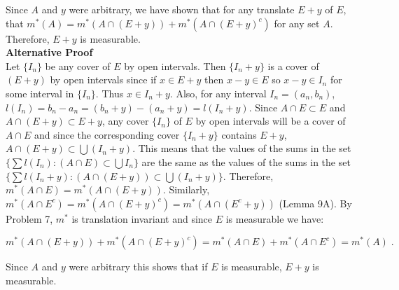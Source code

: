 \documentclass[a4paper]{article}
\begin{document}
Since $A$ and $y$ were arbitrary, we have shown that for any translate $E+y$ of $E$, that $m^*(A) = m^*(A \cap (E+y)) + m^*(A \cap (E+y)^c)$ for any set $A$. Therefore, $E+y$ is measurable.\\

{\bf Alternative Proof}\\
Let $\{I_n\}$ be any cover of $E$ by open intervals. Then $\{I_n + y\}$ is a cover of $(E + y)$ by open intervals since if $x \in E+y$ then $x - y \in E$ so $x-y \in I_n$ for some interval in $\{I_n\}$. Thus $x \in I_n + y$. Also, for any interval $I_n = (a_n,b_n)$, $l(I_n) = b_n - a_n = (b_n +y ) - (a_n+y) = l(I_n + y)$. Since $A\cap E \subset E$ and $A\cap (E+y) \subset E+y$, any cover $\{I_n\}$ of $E$ by open intervals will be a cover of $A\cap E$ and since the corresponding cover $\{I_n + y\}$ contains $E+y$, $A\cap (E+y) \subset \bigcup (I_n+y)$. This means that the values of the sums in the set $\{\sum l(I_n) : (A\cap E) \subset \bigcup I_n\}$ are the same as the values of the sums in the set $\{\sum l(I_n + y) : (A\cap (E+y)) \subset \bigcup (I_n + y)\}$. Therefore, $m^*(A \cap E) = m^*(A\cap (E+y))$. Similarly, $m^*(A\cap E^c) = m^*(A \cap (E+y)^c) = m^*(A \cap (E^c + y))$ (Lemma 9A). By Problem 7, $m^*$ is translation invariant and since $E$ is measurable we have:

$$m^*(A\cap (E+y)) + m^*(A \cap (E+y)^c) = m^*(A\cap E) + m^*(A \cap E^c) = m^*(A) \;.$$

Since $A$ and $y$ were arbitrary this shows that if $E$ is measurable, $E+y$ is measurable. 
\end{document}
